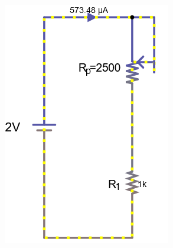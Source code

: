 \documentclass[a4paper]{article}
\begin{document}
\begin{figure}[H]
\begin{subfigure}{0.333\textwidth}
        \includegraphics[width=.9\linewidth]{amp2}
    \end{subfigure}
    \begin{subfigure}{0.333\textwidth}

\end{subfigure}
\end{figure}
\end{document}
